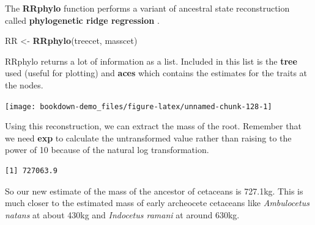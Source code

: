 \documentclass[
]{book}
\newenvironment{Shaded}{\begin{snugshade}}{\end{snugshade}}
\newcommand{\DataTypeTok}[1]{\textcolor[rgb]{0.13,0.29,0.53}{#1}}
\newcommand{\DecValTok}[1]{\textcolor[rgb]{0.00,0.00,0.81}{#1}}
\newcommand{\FloatTok}[1]{\textcolor[rgb]{0.00,0.00,0.81}{#1}}
\newcommand{\KeywordTok}[1]{\textcolor[rgb]{0.13,0.29,0.53}{\textbf{#1}}}
\newcommand{\NormalTok}[1]{#1}
\newcommand{\OperatorTok}[1]{\textcolor[rgb]{0.81,0.36,0.00}{\textbf{#1}}}
\newcommand{\OtherTok}[1]{\textcolor[rgb]{0.56,0.35,0.01}{#1}}
\newcommand{\StringTok}[1]{\textcolor[rgb]{0.31,0.60,0.02}{#1}}
\begin{document}
The \textbf{RRphylo} function performs a variant of ancestral state reconstruction called \textbf{phylogenetic ridge regression} \citep{Castiglione20}.

\begin{Shaded}
\begin{Highlighting}[]
\NormalTok{RR \textless{}{-}}\StringTok{ }\KeywordTok{RRphylo}\NormalTok{(treecet, masscet)}
\end{Highlighting}
\end{Shaded}

RRphylo returns a lot of information as a list. Included in this list is the \textbf{tree} used (useful for plotting) and \textbf{aces} which contains the estimates for the traits at the nodes.

\begin{Shaded}
\end{Shaded}

\begin{center}\texttt{[image: bookdown-demo\_files/figure-latex/unnamed-chunk-128-1]} \end{center}

Using this reconstruction, we can extract the mass of the root. Remember that we need \textbf{exp} to calculate the untransformed value rather than raising to the power of 10 because of the natural log transformation.

\begin{Shaded}
\end{Shaded}

\begin{verbatim}
[1] 727063.9
\end{verbatim}

So our new estimate of the mass of the ancestor of cetaceans is 727.1kg. This is much closer to the estimated mass of early archeocete cetaceans like \emph{Ambulocetus natans} at about 430kg and \emph{Indocetus ramani} at around 630kg.
\end{document}
